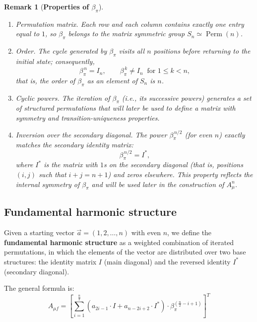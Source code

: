 \documentclass{article}
\newtheorem{remark}[theorem]{Remark}
\begin{document}
\begin{remark}[\textbf{Properties of \(\beta_\pi\)}]\leavevmode
\begin{enumerate}
\item \emph{Permutation matrix}.  
      Each row and each column contains exactly one entry equal to \(1\), so
      \(\beta_\pi\) belongs to the matrix symmetric group
      \(S_n \simeq \operatorname{Perm}(n)\).

\item \emph{Order}.  
      The cycle generated by \(\beta_\pi\) visits all \(n\) positions before returning to the initial state; consequently,
      \[
      \beta_\pi^{\,n} = I_n, \qquad
      \beta_\pi^{\,k} \ne I_n\ \text{ for } 1 \le k < n,
      \]
      that is, the \emph{order} of \(\beta_\pi\) as an element of \(S_n\) is \(n\).

\item \emph{Cyclic powers}.  
      The iteration of \(\beta_\pi\) (i.e., its successive powers) generates a set of structured permutations that will later be used to define a matrix with symmetry and transition-uniqueness properties.

\item \emph{Inversion over the secondary diagonal}.  
      The power \(\beta_\pi^{\,n/2}\) (for even \(n\)) exactly matches the secondary identity matrix:
      \[
        \beta_\pi^{\,n/2} = I^*,
      \]
      where \(I^*\) is the matrix with \(1\)s on the secondary diagonal (that is, positions \((i,j)\) such that \(i + j = n + 1\)) and zeros elsewhere.  
      This property reflects the internal symmetry of \(\beta_\pi\) and will be used later in the construction of \(A_\mu^n\).
\end{enumerate}
\end{remark}




\subsection{Fundamental harmonic structure}
\label{def:harmonic}

Given a starting vector \(\vec{a} = (1, 2, \dots, n)\) with even \(n\), we define the \textbf{fundamental harmonic structure} as a weighted combination of iterated permutations, in which the elements of the vector are distributed over two base structures: the identity matrix \(I\) (main diagonal) and the reversed identity \(I^*\) (secondary diagonal).

The general formula is:
\begin{equation}
   A_{\mu f} = \left[\sum_{i=1}^{\frac{n}{2}} \left(a_{2i-1} \cdot I + a_{n-2i+2} \cdot I^* \right) \cdot \beta_\pi^{\left(\frac{n}{2} - i + 1\right)} \right]^T 
   \label{eq:harmonic-fund}
\end{equation}
\label{app:harmonic-construction}
\end{document}
